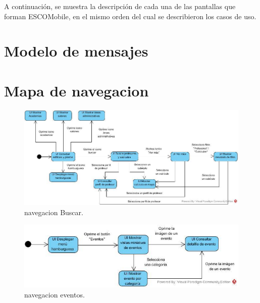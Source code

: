 \documentclass[oneside,10pt]{book}
\begin{document}
\noindent
\newline
A continuación, se muestra la descripción de cada una de las pantallas que forman ESCOMobile,
en el mismo orden del cual se describieron los casos de uso.




\chapter{Modelo de mensajes}


\chapter{Mapa de navegacion}

	\begin{figure}[htbp!]
		\centering
			\includegraphics[width=.5\textwidth]{mapa_nave/imagenesnav/buscar1}
		\caption{navegacion Buscar.}
	\end{figure}
	
	\begin{figure}[htbp!]
		\centering
			\includegraphics[width=.5\textwidth]{mapa_nave/imagenesnav/eventos}
		\caption{navegacion eventos.}
	\end{figure}
	
\end{document}
